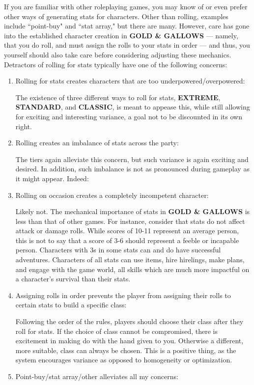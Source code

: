 \documentclass[twoside]{article}
\begin{document}
If you are familiar with other roleplaying games, you may know of or even prefer other ways of generating stats for characters. Other than rolling, examples include ``point-buy" and ``stat array," but there are many. However, care has gone into the established character creation in \textbf{GOLD \& GALLOWS} --- namely, that you do roll, and must assign the rolls to your stats in order --- and thus, you yourself should also take care before considering adjusting these mechanics. Detractors of rolling for stats typically have one of the following concerns:

\bigbreak

\begin{enumerate}[nosep]
\item Rolling for stats creates characters that are too underpowered/overpowered: 

The existence of three different ways to roll for stats, \textbf{EXTREME}, \textbf{STANDARD}, and \textbf{CLASSIC}, is meant to appease this, while still allowing for exciting and interesting variance, a goal not to be discounted in its own right.
\item Rolling creates an imbalance of stats across the party: 

The tiers again alleviate this concern, but such variance is again exciting and desired. In addition, such imbalance is not as pronounced during gameplay as it might appear. Indeed:
\item Rolling on occasion creates a completely incompetent character: 

Likely not. The mechanical importance of stats in \textbf{GOLD \& GALLOWS} is less than that of other games. For instance, consider that stats do not affect attack or damage rolls. While scores of 10-11 represent an average person, this is not to say that a score of 3-6 should represent a feeble or incapable person. Characters with 3s in some stats can and do have successful adventures. Characters of all stats can use items, hire hirelings, make plans, and engage with the game world, all skills which are much more impactful on a character's survival than their stats.
\item Assigning rolls in order prevents the player from assigning their rolls to certain stats to build a specific class: 

Following the order of the rules, players should choose their class after they roll for stats. If the choice of class cannot be compromised, there is excitement in making do with the hand given to you. Otherwise a different, more suitable, class can always be chosen. This is a positive thing, as the system encourages variance as opposed to homogeneity or optimization.
\item Point-buy/stat array/other alleviates all my concerns: 


\end{enumerate}
\end{document}
